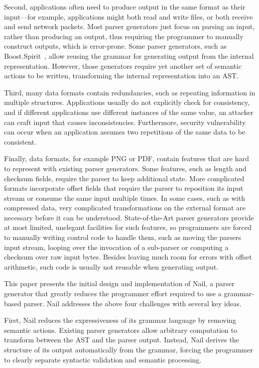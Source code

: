 Second,  applications often need to produce output in the same
format as their input---for example, applications might both
read and write files, or both receive and send network packets.
Most parser generators just focus on parsing an input, rather
than producing an output, thus requiring the programmer to manually
construct outputs, which is error-prone.  Some parser generators, such as
Boost.Spirit~\cite{boost-spirit},
allow reusing the grammar for generating output from the internal
representation.  However, those generators require yet another set of
semantic actions to be written, transforming the internal representation
into an AST\@.

Third, many data formats contain redundancies, such as repeating information in multiple structures.
Applications usually do not explicitly check for consistency, and if different applications use
different instances of the same value, an attacker can craft input that causes inconsistencies.
Furthermore, security vulnerability can occur when an application assumes two repetitions of the
same data to be consistent.

Finally, data formats, for example PNG or PDF, contain features that are hard to represent with
existing parser generators. Some features, such as length and checksum fields, require the parser to
keep additional state. More complicated formats incorporate offset fields that require the parser to
reposition its input stream or consume the same input multiple times. In some cases, such as with
compressed data, very complicated transformations on the external format are necessary before it can
be understood. State-of-the-Art parser generators provide at most limited, unelegant facilities for
such features, so programmers are forced to manually writing control code to handle them, such as
moving the parsers input stream, looping over the invocation of a sub-parser or computing a checksum
over raw input bytes. Besides leaving much room for errors with offset arithmetic, such code is
usually not reusable when generating output.



This paper presents the initial design and implementation of Nail, a parser
generator that greatly reduces the programmer effort required to use a
grammar-based parser. Nail addresses the above four challenges with several key
ideas.

First, Nail reduces the expressiveness of its grammar language by removing
semantic actions. Existing parser generators allow arbitrary computation to
transform between the AST and the parser output. Instead, Nail derives the
structure of its output automatically from the grammar, forcing the programmer
to clearly separate syntactic validation and semantic processing.

